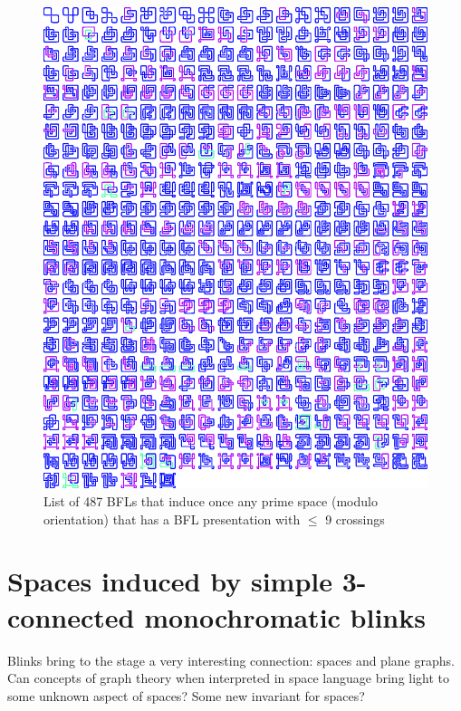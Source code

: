 \begin{figure}[h!tp]
   \begin{center}
      \leavevmode
      \includegraphics[width=15cm]{A.figs/primespace487representantlinks.eps}
   \end{center}
   \vspace{-0.7cm}
   \caption{ List of 487 BFLs that induce once any prime space (modulo orientation)
   that has a BFL presentation with $\leq$ 9 crossings}
   \label{fig:primeSpace487RepresentativeLinks}
\end{figure}

\newpage

\section{Spaces induced by simple 3-connected monochromatic blinks}

Blinks bring to the stage a very interesting connection: spaces and
plane graphs. Can concepts of graph theory when interpreted in space
language bring light to some unknown aspect of spaces? Some new
invariant for spaces?

